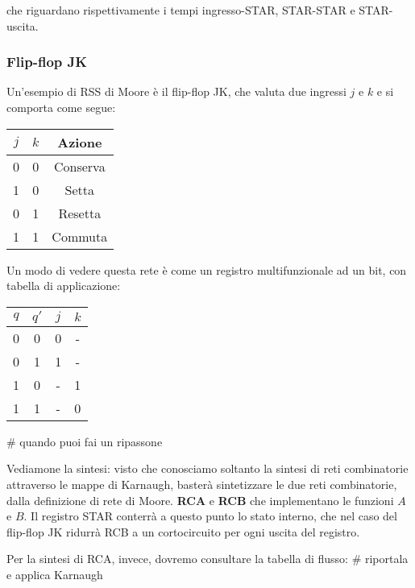 \documentclass[a4paper,11pt]{article}
\begin{document}
che riguardano rispettivamente i tempi ingresso-STAR, STAR-STAR e STAR-uscita.

\subsubsection{Flip-flop JK}
Un'esempio di RSS di Moore è il flip-flop JK, che valuta due ingressi $j$ e $k$ e si comporta come segue:
\begin{table}[h!]
	\center {}
	\begin{tabular} { c | c | c }
		$j$ & $k$ & Azione \\ 
		\hline 
		0 & 0 & Conserva \\ 
		1 & 0 & Setta \\ 
		0 & 1 & Resetta \\ 
		1 & 1 & Commuta
	\end{tabular}
\end{table}

Un modo di vedere questa rete è come un registro multifunzionale ad un bit, con tabella di applicazione:
\begin{table}[h!]
	\center 
	\begin{tabular} { c  c | c  c }
		$q$ & $q'$ & $j$ & $k$ \\ 
		\hline 
		0 & 0 & 0 & - \\ 
		0 & 1 & 1 & - \\ 
		1 & 0 & - & 1 \\ 
		1 & 1 & - & 0
	\end{tabular}
\end{table}

# quando puoi fai un ripassone

Vediamone la sintesi: visto che conosciamo soltanto la sintesi di reti combinatorie attraverso le mappe di Karnaugh, basterà sintetizzare le due reti combinatorie, dalla definizione di rete di Moore. \textbf{RCA} e \textbf{RCB} che implementano le funzioni $A$ e $B$.
Il registro STAR conterrà a questo punto lo stato interno, che nel caso del flip-flop JK ridurrà RCB a un cortocircuito per ogni uscita del registro.

Per la sintesi di RCA, invece, dovremo consultare la tabella di flusso:
# riportala e applica Karnaugh
\end{document}
